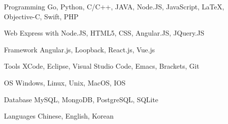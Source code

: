 


\begin{cvskills}


\cvskill
{Programming} %
{Go, Python, C/C++, JAVA, Node.JS, JavaScript, LaTeX, Objective-C, Swift, PHP} %


\cvskill
{Web} %
{Express with Node.JS, HTML5, CSS, Angular.JS, JQuery.JS} %


\cvskill
{Framework} %
{Angular.js, Loopback, React.js, Vue.js} %


\cvskill
{Tools} %
{XCode, Eclipse, Visual Studio Code, Emacs, Brackets, Git} %


\cvskill
{OS} %
{Windows, Linux, Unix, MacOS, IOS} %


\cvskill
{Database} %
{MySQL, MongoDB, PostgreSQL, SQLite} %


\cvskill
{Languages} %
{Chinese, English, Korean} %


\end{cvskills}